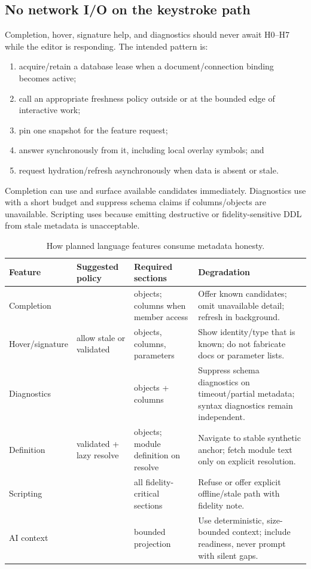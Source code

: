 \documentclass[11pt]{article}
\newcommand{\code}[1]{\texttt{\detokenize{#1}}}
\begin{document}
\subsection{No network I/O on the keystroke path}

Completion, hover, signature help, and diagnostics should never await H0--H7 while the editor is responding. The intended pattern is:

\begin{enumerate}
  \item acquire/retain a database lease when a document/connection binding becomes active;
  \item call an appropriate freshness policy outside or at the bounded edge of interactive work;
  \item pin one snapshot for the feature request;
  \item answer synchronously from it, including local overlay symbols; and
  \item request hydration/refresh asynchronously when data is absent or stale.
\end{enumerate}

Completion can use \code{allowStale} and surface available candidates immediately. Diagnostics use \code{requireValidated} with a short budget and suppress schema claims if columns/objects are unavailable. Scripting uses \code{requireLive} because emitting destructive or fidelity-sensitive DDL from stale metadata is unacceptable.

\begin{table}[H]
\centering
\small
\caption{How planned language features consume metadata honesty.}
\label{tab:language}
\begin{tabularx}{\textwidth}{@{}p{}p{}p{}X@{}}
\toprule
\textbf{Feature} & \textbf{Suggested policy} & \textbf{Required sections} & \textbf{Degradation}\\
\midrule
Completion & \code{allowStale} & objects; columns when member access & Offer known candidates; omit unavailable detail; refresh in background.\\
Hover/signature & allow stale or validated & objects, columns, parameters & Show identity/type that is known; do not fabricate docs or parameter lists.\\
Diagnostics & \code{requireValidated} & objects + columns & Suppress schema diagnostics on timeout/partial metadata; syntax diagnostics remain independent.\\
Definition & validated + lazy resolve & objects; module definition on resolve & Navigate to stable synthetic anchor; fetch module text only on explicit resolution.\\
Scripting & \code{requireLive} & all fidelity-critical sections & Refuse or offer explicit offline/stale path with fidelity note.\\
AI context & \code{allowStale} & bounded projection & Use deterministic, size-bounded context; include readiness, never prompt with silent gaps.\\
\bottomrule
\end{tabularx}
\end{table}
\end{document}
